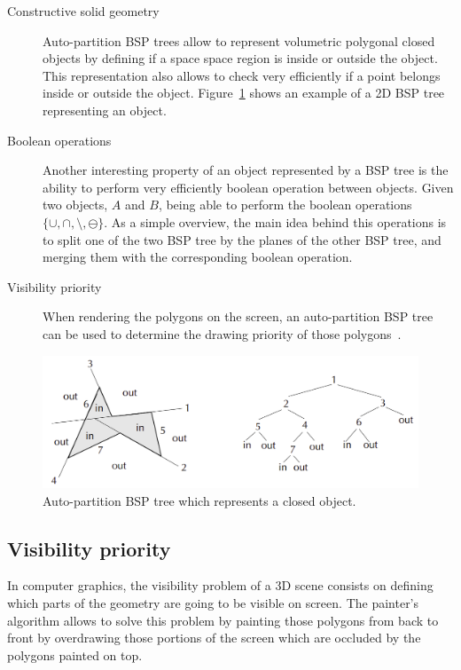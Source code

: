 \documentclass{article}
\begin{document}
\begin{description}
\item[Constructive solid geometry] Auto-partition BSP trees allow to represent volumetric polygonal closed objects by defining if a space space region is inside or outside the object. This representation also allows to check very efficiently if a point belongs inside or outside the object. Figure~\ref{object} shows an example of a 2D BSP tree representing an object.

\item[Boolean operations] Another interesting property of an object represented by a BSP tree is the ability to perform very efficiently boolean operation between objects. Given two objects, $A$ and $B$, being able to perform the boolean operations $\{\cup, \cap, \setminus, \ominus\}$. As a simple overview, the main idea behind this operations is to split one of the two BSP tree by the planes of the other BSP tree, and merging them with the corresponding boolean operation.

\item[Visibility priority] When rendering the polygons on the screen, an auto-partition BSP tree can be used to determine the drawing priority of those polygons~\cite{siggraph}.
\end{description}

\begin{figure}
\includegraphics[width=\linewidth]{bsp_tree_object.png}
\caption{Auto-partition BSP tree which represents a closed object.}
\label{object}
\end{figure}

\subsection*{Visibility priority}
In computer graphics, the visibility problem of a 3D scene consists on defining which parts of the geometry are going to be visible on screen. The painter's algorithm allows to solve this problem by painting those polygons from back to front by overdrawing those portions of the screen which are occluded by the polygons painted on top. 
\end{document}
